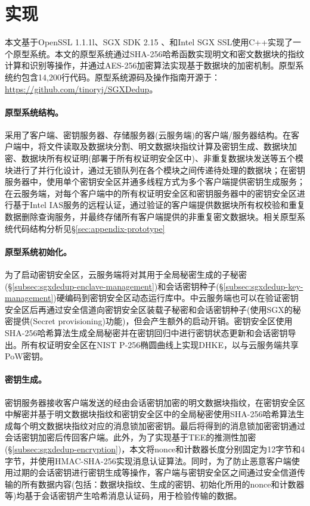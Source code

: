 \section{\sysnameS 实现}
\label{sec:sgxdedup-implementation}

本文基于OpenSSL 1.1.1l、SGX SDK 2.15 、和Intel SGX SSL使用C++实现了一个\sysnameS 原型系统。本文的原型系统通过SHA-256哈希函数实现明文和密文数据块的指纹计算和识别等操作，并通过AES-256加密算法实现基于数据块的加密机制。原型系统约包含14,200行代码。原型系统源码及操作指南开源于：\href{https://github.com/tinoryj/SGXDedup}{https://github.com/tinoryj/SGXDedup}。

\paragraph*{原型系统结构。}
\sysnameS 采用了客户端、密钥服务器、存储服务器(云服务端)的客户端/服务器结构。在客户端中，将文件读取及数据块分割、明文数据块指纹计算及密钥生成、数据块加密、数据块所有权证明(部署于所有权证明安全区中)、非重复数据块发送等五个模块进行了并行化设计，通过无锁队列在各个模块之间传递待处理的数据块；在密钥服务器中，使用单个密钥安全区并通多线程方式为多个客户端提供密钥生成服务；在云服务端，对每个客户端中的所有权证明安全区和密钥服务器中的密钥安全区进行基于Intel IAS服务的远程认证，通过验证的客户端提供数据块所有权校验和重复数据删除查询服务，并最终存储所有客户端提供的非重复密文数据块。相关原型系统代码结构分析见\S\ref{sec:appendix-prototype}

\paragraph*{原型系统初始化。}
为了启动密钥安全区，云服务端将对其用于全局秘密生成的子秘密(\S\ref{subsec:sgxdedup-enclave-management})和会话密钥种子(\S\ref{subsec:sgxdedup-key-management})硬编码到密钥安全区动态运行库中。\sysnameS 中云服务端也可以在验证密钥安全区后再通过安全信道向密钥安全区装载子秘密和会话密钥种子(使用SGX的秘密提供(Secret provisioning)功能)，但会产生额外的启动开销。密钥安全区使用SHA-256哈希算法生成全局秘密并在密钥回归中进行密钥状态更新和会话密钥导出。所有权证明安全区在NIST P-256椭圆曲线上实现DHKE，以与云服务端共享PoW密钥。

\paragraph*{密钥生成。}密钥服务器接收客户端发送的经由会话密钥加密的明文数据块指纹，在密钥安全区中解密并基于明文数据块指纹和密钥安全区中的全局秘密使用SHA-256哈希算法生成每个明文数据块指纹对应的消息锁加密密钥。最后将得到的消息锁加密密钥通过会话密钥加密后传回客户端。此外，为了实现基于TEE的推测性加密(\S\ref{subsec:sgxdedup-encryption})，本文将nonce和计数器长度分别固定为12字节和4字节，并使用HMAC-SHA-256实现消息认证算法。同时，为了防止恶意客户端使用过期的会话密钥进行密钥生成等操作，客户端与密钥安全区之间通过安全信道传输的所有数据内容(包括：数据块指纹、生成的密钥、初始化所用的nonce和计数器等)均基于会话密钥产生哈希消息认证码，用于检验传输的数据。

